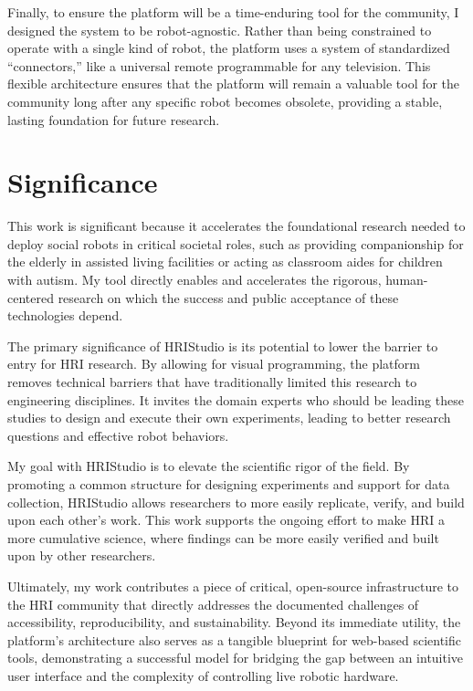 \documentclass[numbib]{buthesis_p}  %
\begin{document}
Finally, to ensure the platform will be a time-enduring tool for the community, I designed the system to be robot-agnostic. Rather than being constrained to operate with a single kind of robot, the platform uses a system of standardized ``connectors,'' like a universal remote programmable for any television. This flexible architecture ensures that the platform will remain a valuable tool for the community long after any specific robot becomes obsolete, providing a stable, lasting foundation for future research.

\section{Significance}

This work is significant because it accelerates the foundational research needed to deploy social robots in critical societal roles, such as providing companionship for the elderly in assisted living facilities or acting as classroom aides for children with autism. My tool directly enables and accelerates the rigorous, human-centered research on which the success and public acceptance of these technologies depend.

The primary significance of HRIStudio is its potential to lower the barrier to entry for HRI research. By allowing for visual programming, the platform removes technical barriers that have traditionally limited this research to engineering disciplines. It invites the domain experts who should be leading these studies to design and execute their own experiments, leading to better research questions and effective robot behaviors.

My goal with HRIStudio is to elevate the scientific rigor of the field. By promoting a common structure for designing experiments and support for data collection, HRIStudio allows researchers to more easily replicate, verify, and build upon each other's work. This work supports the ongoing effort to make HRI a more cumulative science, where findings can be more easily verified and built upon by other researchers.

Ultimately, my work contributes a piece of critical, open-source infrastructure to the HRI community that directly addresses the documented challenges of accessibility, reproducibility, and sustainability. Beyond its immediate utility, the platform's architecture also serves as a tangible blueprint for web-based scientific tools, demonstrating a successful model for bridging the gap between an intuitive user interface and the complexity of controlling live robotic hardware.
\end{document}

